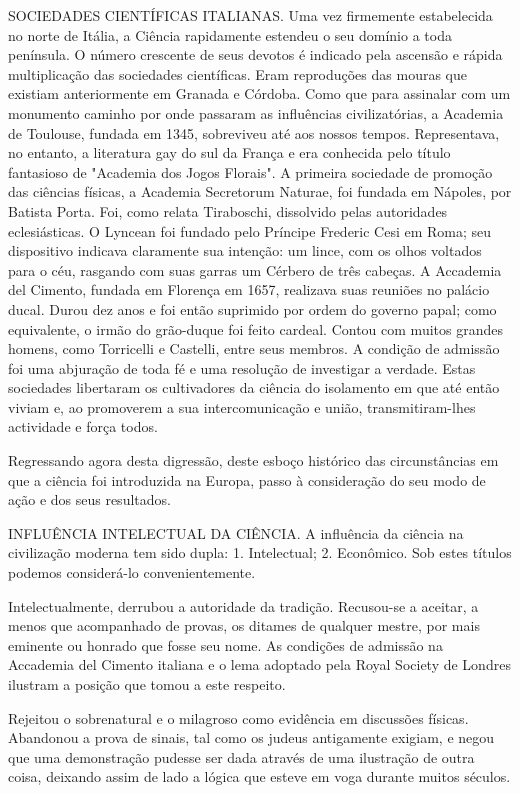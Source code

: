 \documentclass[11pt,a5paper,twoside,openany]{book}
\begin{document}
SOCIEDADES CIENTÍFICAS ITALIANAS. Uma vez firmemente estabelecida no norte de Itália, a Ciência rapidamente estendeu o seu domínio a toda península. O número crescente de seus devotos é indicado pela ascensão e rápida multiplicação das sociedades científicas. Eram reproduções das mouras que existiam anteriormente em Granada e Córdoba. Como que para assinalar com um monumento caminho por onde passaram as influências civilizatórias, a Academia de Toulouse, fundada em 1345, sobreviveu até aos nossos tempos. Representava, no entanto, a literatura gay do sul da França e era conhecida pelo título fantasioso de "Academia dos Jogos Florais". A primeira sociedade de promoção das ciências físicas, a Academia Secretorum Naturae, foi fundada em Nápoles, por Batista Porta. Foi, como relata Tiraboschi, dissolvido pelas autoridades eclesiásticas. O Lyncean foi fundado pelo Príncipe Frederic Cesi em Roma; seu dispositivo indicava claramente sua intenção: um lince, com os olhos voltados para o céu, rasgando com suas garras um Cérbero de três cabeças. A Accademia del Cimento, fundada em Florença em 1657, realizava suas reuniões no palácio ducal. Durou dez anos e foi então suprimido por ordem do governo papal; como equivalente, o irmão do grão-duque foi feito cardeal. Contou com muitos grandes homens, como Torricelli e Castelli, entre seus membros. A condição de admissão foi uma abjuração de toda fé e uma resolução de investigar a verdade. Estas sociedades libertaram os cultivadores da ciência do isolamento em que até então viviam e, ao promoverem a sua intercomunicação e união, transmitiram-lhes actividade e força todos.

Regressando agora desta digressão, deste esboço histórico das circunstâncias em que a ciência foi introduzida na Europa, passo à consideração do seu modo de ação e dos seus resultados.

INFLUÊNCIA INTELECTUAL DA CIÊNCIA. A influência da ciência na civilização moderna tem sido dupla: 1. Intelectual; 2. Econômico. Sob estes títulos podemos considerá-lo convenientemente.

Intelectualmente, derrubou a autoridade da tradição. Recusou-se a aceitar, a menos que acompanhado de provas, os ditames de qualquer mestre, por mais eminente ou honrado que fosse seu nome. As condições de admissão na Accademia del Cimento italiana e o lema adoptado pela Royal Society de Londres ilustram a posição que tomou a este respeito.

Rejeitou o sobrenatural e o milagroso como evidência em discussões físicas. Abandonou a prova de sinais, tal como os judeus antigamente exigiam, e negou que uma demonstração pudesse ser dada através de uma ilustração de outra coisa, deixando assim de lado a lógica que esteve em voga durante muitos séculos.
\end{document}

